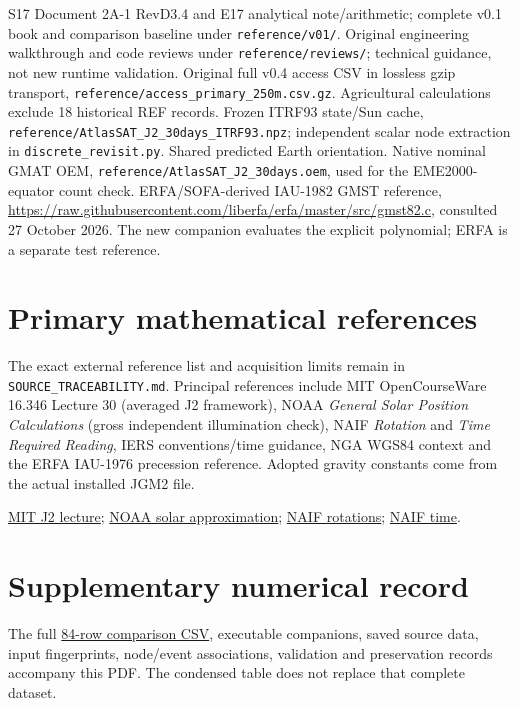 \documentclass[10pt,a4paper]{article}
\numberwithin{equation}{section}
\begin{document}
\begin{thebibliography}{S17}
 Document 2A-1 RevD3.4 and E17 analytical note/arithmetic; complete v0.1 book and comparison baseline under \nolinkurl{reference/v01/}.
 Original engineering walkthrough and code reviews under \nolinkurl{reference/reviews/}; technical guidance, not new runtime validation.
 Original full v0.4 access CSV in lossless gzip transport, \nolinkurl{reference/access_primary_250m.csv.gz}. Agricultural calculations exclude 18 historical REF records.
 Frozen ITRF93 state/Sun cache, \nolinkurl{reference/AtlasSAT_J2_30days_ITRF93.npz}; independent scalar node extraction in \nolinkurl{discrete_revisit.py}. Shared predicted Earth orientation.
 Native nominal GMAT OEM, \nolinkurl{reference/AtlasSAT_J2_30days.oem}, used for the EME2000-equator count check.
 ERFA/SOFA-derived IAU-1982 GMST reference, \url{https://raw.githubusercontent.com/liberfa/erfa/master/src/gmst82.c}, consulted 27 October 2026. The new companion evaluates the explicit polynomial; ERFA is a separate test reference.
\end{thebibliography}
\endgroup
\section*{Primary mathematical references}
The exact external reference list and acquisition limits remain in \nolinkurl{SOURCE_TRACEABILITY.md}. Principal references include MIT OpenCourseWare 16.346 Lecture 30 (averaged J2 framework), NOAA \emph{General Solar Position Calculations} (gross independent illumination check), NAIF \emph{Rotation} and \emph{Time Required Reading}, IERS conventions/time guidance, NGA WGS84 context and the ERFA IAU-1976 precession reference. Adopted gravity constants come from the actual installed JGM2 file.
\par\href{https://ocw.mit.edu/courses/16-346-astrodynamics-fall-2008/resources/lec_30/}{MIT J2 lecture};
\href{https://gml.noaa.gov/grad/solcalc/solareqns.PDF}{NOAA solar approximation};
\href{https://naif.jpl.nasa.gov/pub/naif/toolkit_docs/C/req/rotation.html}{NAIF rotations};
\href{https://naif.jpl.nasa.gov/pub/naif/toolkit_docs/C/req/time.html}{NAIF time}.
\section*{Supplementary numerical record}
The full \href{../evidence/ANALYTICAL_COMPARISON.csv}{84-row comparison CSV}, executable companions, saved source data, input fingerprints, node/event associations, validation and preservation records accompany this PDF. The condensed table does not replace that complete dataset.
\end{document}

